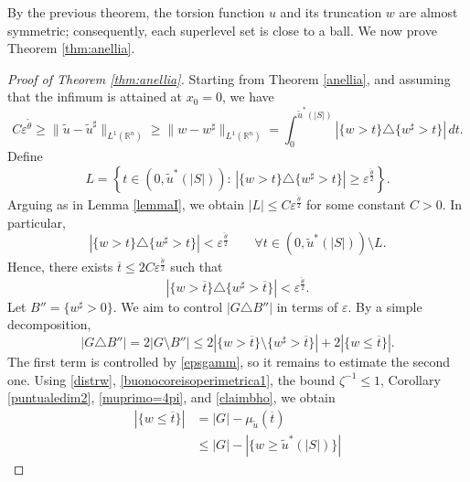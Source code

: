 \documentclass[oneside,a4paper,11pt,notitlepage]{article}
\theoremstyle{definition}
\theoremstyle{plain}
\theoremstyle{definition}
\begin{document}
By the previous theorem, the torsion function $u$ and its truncation $w$ are almost symmetric; consequently, each superlevel set is close to a ball. We now prove Theorem \ref{thm:anellia}.



\begin{proof}[Proof of Theorem \ref{thm:anellia}]
Starting from Theorem \ref{anellia}, and assuming that the infimum is attained at $x_0=0$, we have
\begin{equation*}
C\varepsilon^{\tilde\theta}
\geq \|\tilde u-\tilde u^\sharp\|_{L^1(\mathbb{R}^n)}
\geq \|w-w^\sharp\|_{L^1(\mathbb{R}^n)}
= \int_0^{\tilde u^*(|S|)} |\{w>t\}\triangle\{w^\sharp>t\}|\,dt.
\end{equation*}
Define
\begin{equation*}
L=\left\{t\in(0,\tilde u^*(|S|)):\,
|\{w>t\}\triangle\{w^\sharp>t\}|\geq \varepsilon^{\frac{\tilde\theta}{2}}\right\}.
\end{equation*}
Arguing as in Lemma \ref{lemmaI}, we obtain $|L|\leq C\varepsilon^{\frac{\tilde\theta}{2}}$ for some constant $C>0$. In particular,
\begin{equation}
\label{measureofT}
|\{w>t\}\triangle\{w^\sharp>t\}|
< \varepsilon^{\frac{\tilde\theta}{2}}
\qquad \forall t\in(0,\tilde u^*(|S|))\setminus L.
\end{equation}
Hence, there exists $\overline t \leq 2C\varepsilon^{\frac{\tilde\theta}{2}}$ such that
\begin{equation}
\label{epsgamm}
|\{w>\overline t\}\triangle\{w^\sharp>\overline t\}|
< \varepsilon^{\frac{\tilde\theta}{2}}.
\end{equation}
Let $B''=\{w^\sharp>0\}$. We aim to control $|G\triangle B''|$ in terms of $\varepsilon$. 
By a simple decomposition,
\begin{equation}
\label{triangG}
|G\triangle B''|
= 2|G\setminus B''|
\leq 2|\{w>\overline t\}\setminus\{w^\sharp>\overline t\}|
+ 2|\{w\leq \overline t\}|.
\end{equation}
The first term is controlled by \eqref{epsgamm}, so it remains to estimate the second one. Using \eqref{distrw}, \eqref{buonocoreisoperimetrica1}, the bound $\zeta^{-1}\leq 1$, Corollary \ref{puntualedim2}, \eqref{muprimo=4pi}, and \eqref{claimbho}, we obtain
\begin{equation}
\label{listone}
\begin{aligned}
|\{ w \leq \overline t\}|
&= |G| - \mu_{\tilde u}(\overline t) \\
&\leq |G| - |\{w \geq \tilde u^*(|S|)\}|

\end{aligned}
\end{equation}
\end{proof}
\end{document}
